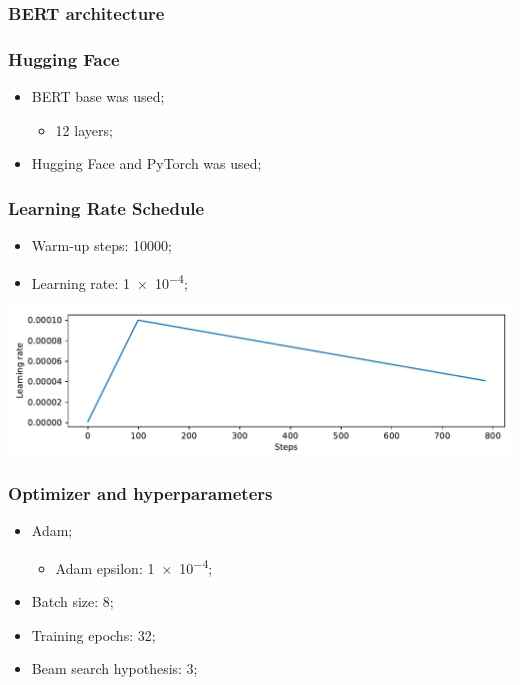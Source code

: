 \documentclass{beamer}
\begin{document}
\begin{frame}
  \frametitle{BERT architecture}
\end{frame}

\begin{frame}
  \frametitle{Hugging Face}

  \begin{itemize}
    \item BERT base was used;
          \begin{itemize}
            \item 12 layers;
          \end{itemize}
    \item Hugging Face and PyTorch was used;
  \end{itemize}
\end{frame}

\begin{frame}
  \frametitle{Learning Rate Schedule}

  \begin{itemize}
    \item Warm-up steps: \num{10000};
    \item Learning rate: \num{1e-4};
  \end{itemize}

  \bigbreak
  \bigbreak

  \includegraphics[width=\textwidth]{../images/warmup_linear_schedule.pdf}
\end{frame}

\begin{frame}
  \frametitle{Optimizer and hyperparameters}

  \begin{itemize}
    \item Adam;
          \begin{itemize}
            \item Adam epsilon: \num{1e-4};
          \end{itemize}
    \item Batch size: \num{8};
    \item Training epochs: \num{32};
    \item Beam search hypothesis: \num{3};
  \end{itemize}
\end{frame}
\end{document}

